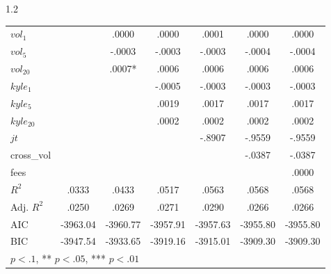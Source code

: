\documentclass[10pt]{article}
\begin{document}
\begin{setstretch}{1.2}
\begin{small}
\begin{longtable}{l*{6}{c}}
$vol_1$ & & \hfil .0000 & \hfil .0000 & \hfil .0001 & \hfil .0000 & \hfil .0000 \\
$vol_5$ & & \hfil -.0003 & \hfil -.0003 & \hfil -.0003 & \hfil -.0004 & \hfil -.0004 \\
$vol_{20}$ & & \hfil .0007* & \hfil .0006 & \hfil .0006 & \hfil .0006 & \hfil .0006 \\
$kyle_1$ & & & \hfil -.0005 & \hfil -.0003 & \hfil -.0003 & \hfil -.0003 \\
$kyle_5$ & & & \hfil .0019 & \hfil .0017 & \hfil .0017 & \hfil .0017 \\
$kyle_{20}$ & & & \hfil .0002 & \hfil .0002 & \hfil .0002 & \hfil .0002 \\
$jt$ & & & & \hfil -.8907 & \hfil -.9559 & \hfil -.9559 \\
cross\_vol & & & & & \hfil -.0387 & \hfil -.0387 \\
fees & & & & & & \hfil .0000 \\
\hline
$R^2$ & \hfil .0333 & \hfil .0433 & \hfil .0517 & \hfil .0563 & \hfil .0568 & \hfil .0568 \\
Adj. $R^2$ & \hfil .0250 & \hfil .0269 & \hfil .0271 & \hfil .0290 & \hfil .0266 & \hfil .0266 \\
AIC & \hfil -3963.04 & \hfil -3960.77 & \hfil -3957.91 & \hfil -3957.63 & \hfil -3955.80 & \hfil -3955.80 \\
BIC & \hfil -3947.54 & \hfil -3933.65 & \hfil -3919.16 & \hfil -3915.01 & \hfil -3909.30 & \hfil -3909.30 \\
\hline
\multicolumn{7}{l}{\footnotesize * $p<.1$, ** $p<.05$, *** $p<.01$}
\end{longtable}
\end{small}

\end{setstretch}
\end{document}
